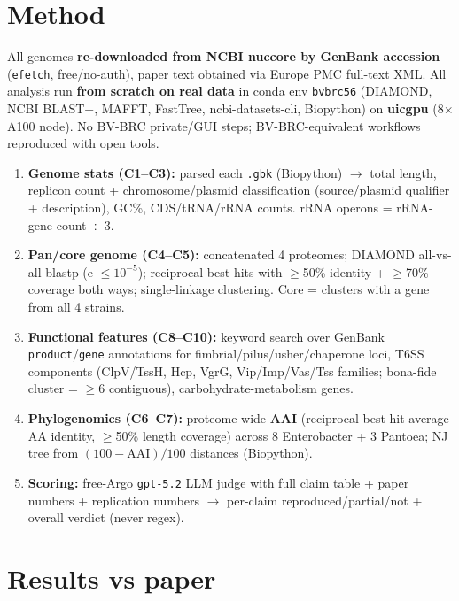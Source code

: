 \documentclass[11pt,letterpaper]{article}
\begin{document}
\section{Method}
All genomes \textbf{re-downloaded from NCBI nuccore by GenBank accession} (\texttt{efetch}, free/no-auth), paper text obtained via Europe PMC full-text XML. All analysis run \textbf{from scratch on real data} in conda env \texttt{bvbrc56} (DIAMOND, NCBI BLAST+, MAFFT, FastTree, ncbi-datasets-cli, Biopython) on \textbf{uicgpu} (8$\times$A100 node). No BV-BRC private/GUI steps; BV-BRC-equivalent workflows reproduced with open tools.
\begin{enumerate}[leftmargin=*]
    \item \textbf{Genome stats (C1--C3):} parsed each \texttt{.gbk} (Biopython) $\to$ total length, replicon count + chromosome/plasmid classification (source/plasmid qualifier + description), GC\%, CDS/tRNA/rRNA counts. rRNA operons = rRNA-gene-count $\div$ 3.
    \item \textbf{Pan/core genome (C4--C5):} concatenated 4 proteomes; DIAMOND all-vs-all blastp (e $\le 10^{-5}$); reciprocal-best hits with $\geq$50\% identity + $\geq$70\% coverage both ways; single-linkage clustering. Core = clusters with a gene from all 4 strains.
    \item \textbf{Functional features (C8--C10):} keyword search over GenBank \texttt{product}/\texttt{gene} annotations for fimbrial/pilus/usher/chaperone loci, T6SS components (ClpV/TssH, Hcp, VgrG, Vip/Imp/Vas/Tss families; bona-fide cluster = $\geq$6 contiguous), carbohydrate-metabolism genes.
    \item \textbf{Phylogenomics (C6--C7):} proteome-wide \textbf{AAI} (reciprocal-best-hit average AA identity, $\geq$50\% length coverage) across 8 Enterobacter + 3 Pantoea; NJ tree from $(100-\text{AAI})/100$ distances (Biopython).
    \item \textbf{Scoring:} free-Argo \texttt{gpt-5.2} LLM judge with full claim table + paper numbers + replication numbers $\to$ per-claim reproduced/partial/not + overall verdict (never regex).
\end{enumerate}

\section{Results vs paper}
\end{document}
